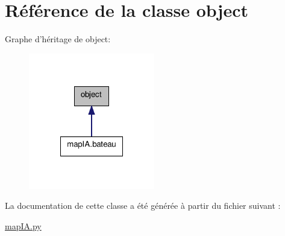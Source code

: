 \hypertarget{classobject}{\section{Référence de la classe object}
\label{classobject}
}


Graphe d'héritage de object\-:
\nopagebreak
\begin{figure}[H]
\begin{center}
\leavevmode
\includegraphics[width=156pt]{classobject__inherit__graph}
\end{center}
\end{figure}


La documentation de cette classe a été générée à partir du fichier suivant \-:\begin{DoxyCompactItemize}
\item 
\hyperlink{mapIA_8py}{map\-I\-A.\-py}\end{DoxyCompactItemize}
